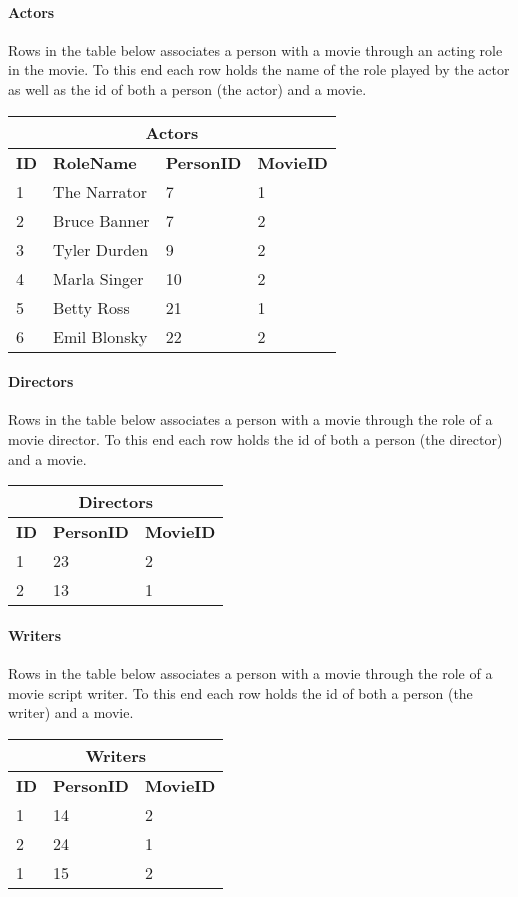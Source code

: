 \paragraph{Actors}
Rows in the table below associates a person with a movie through an acting role in the movie.
To this end each row holds the name of the role played by the actor as well as the id of both a person (the actor) and a movie.
\begin{center}
\begin{tabular}{|l|l|l|l|}
\hline
\multicolumn{4}{|c|}{Actors} \\ \hline \hline
\textbf{ID} & \textbf{RoleName} & \textbf{PersonID} & \textbf{MovieID} \\ \hline \hline
1 & The Narrator & 7 & 1 \\ \hline
2 & Bruce Banner & 7 & 2 \\ \hline
3 & Tyler Durden & 9 & 2 \\ \hline
4 & Marla Singer & 10 & 2 \\ \hline
5 & Betty Ross & 21 & 1 \\ \hline
6 & Emil Blonsky & 22 & 2 \\\hline 
\end{tabular}
\end{center}

\paragraph{Directors}
Rows in the table below associates a person with a movie through the role of a movie director.
To this end each row holds the id of both a person (the director) and a movie.
\begin{center}
\begin{tabular}{|l|l|l|}
\hline
\multicolumn{3}{|c|}{Directors} \\ \hline \hline
\textbf{ID} & \textbf{PersonID} & \textbf{MovieID} \\ \hline \hline
1 & 23 & 2 \\ \hline
2 & 13 & 1 \\ \hline
\end{tabular}
\end{center}

\paragraph{Writers}
Rows in the table below associates a person with a movie through the role of a movie script writer.
To this end each row holds the id of both a person (the writer) and a movie.
\begin{center}
\begin{tabular}{|l|l|l|}
\hline
\multicolumn{3}{|c|}{Writers} \\ \hline \hline
\textbf{ID} & \textbf{PersonID} & \textbf{MovieID} \\ \hline \hline
1 & 14 & 2 \\ \hline
2 & 24 & 1 \\ \hline
1 & 15 & 2 \\ \hline
\end{tabular}
\end{center}

